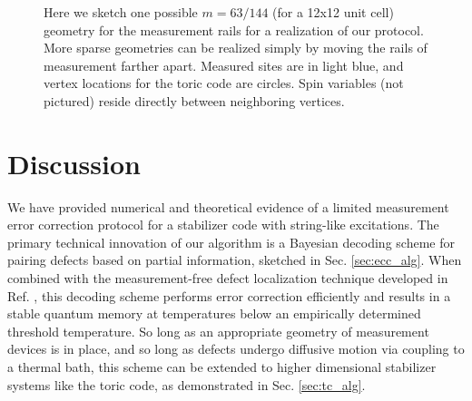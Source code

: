 \documentclass[twocolumn,superscriptaddress,aps,prb,floatfix]{revtex4-1}
\begin{document}
\begin{figure}
\begin{center}
\end{center}
\caption{Here we sketch one possible $m=63/144$ (for a 12x12 unit cell) geometry for the measurement rails for a realization of our protocol.  More sparse geometries can be realized simply by moving the rails of measurement farther apart.  Measured sites are in light blue, and vertex locations for the toric code are circles.  Spin variables (not pictured) reside directly between neighboring vertices.}
\label{fig:tc_fig}
\end{figure}




\section{Discussion}
\label{sec:discussion}

We have provided numerical and theoretical evidence of a limited measurement error correction protocol for a stabilizer code with string-like excitations.  The primary technical innovation of our algorithm is a Bayesian decoding scheme for pairing defects based on partial information, sketched in Sec. \ref{sec:ecc_alg}. When combined with the measurement-free defect localization technique developed in Ref. \cite{Freeman2017}, this decoding scheme performs error correction efficiently and results in a stable quantum memory at temperatures below an empirically determined threshold temperature.  So long as an appropriate geometry of measurement devices is in place, and so long as defects undergo diffusive motion via coupling to a thermal bath, this scheme can be extended to higher dimensional stabilizer systems like the toric code, as demonstrated in Sec. \ref{sec:tc_alg}.
\end{document}
